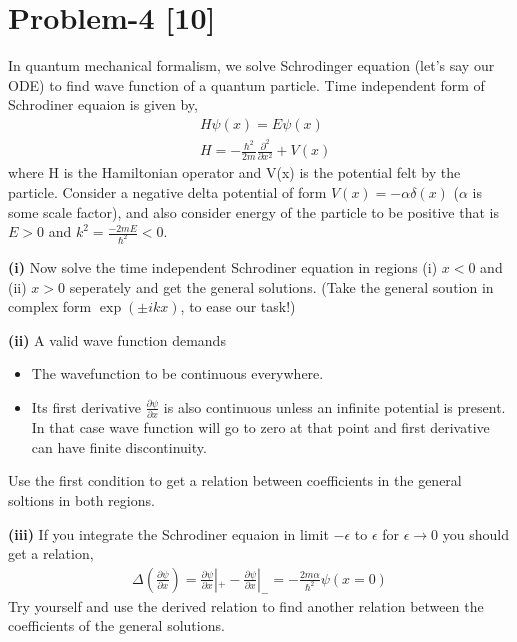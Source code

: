 \documentclass[12pt, a4paper]{article}
\begin{document}
\section*{Problem-4 \hfill \textbf{[10]}}
In quantum mechanical formalism, we solve Schrodinger equation (let's say our ODE) to find wave 
function of a quantum particle. Time independent form of Schrodiner equaion is given by,
\begin{align*}
    &H\psi(x) = E\psi(x)\\
    &H= -\frac{\hbar^2}{2m}\frac{\partial^2}{\partial x^2} + V(x)
\end{align*}
where H is the Hamiltonian operator and V(x) is the potential felt by the particle.
Consider a negative delta potential of form $V(x) = -\alpha\delta(x)$ ($\alpha$ is some scale factor),
and also consider energy of the particle to be positive that is $E>0$ and 
$k^2 = \frac{-2mE}{\hbar^2} <0$. 

\textbf{(i)} Now solve the time independent Schrodiner equation in regions (i) $x<0$ and (ii) $x>0$ 
seperately and get the general solutions. (Take the general soution in complex form $\exp(\pm ikx)$, to ease our task!) 

\textbf{(ii)} A valid wave function demands 
\begin{itemize}
    \item The wavefunction to be continuous everywhere.
    \item Its first derivative $\frac{\partial \psi}{\partial x}$ is also continuous unless an 
    infinite potential is present. In that case wave function will go to zero at that point and first
    derivative can have finite discontinuity.
\end{itemize}
Use the first condition to get a relation between coefficients in the general soltions in both regions.

\textbf{(iii)} If you integrate the Schrodiner equaion in limit $-\epsilon$ to $\epsilon$ for 
$\epsilon \rightarrow 0$ you should get a relation,
\begin{align*}
    \Delta(\frac{\partial \psi}{\partial x}) = \frac{\partial \psi}{\partial x}|_+ - \frac{\partial \psi}{\partial x}|_- 
    = -\frac{2m\alpha}{\hbar^2}\psi(x=0)
\end{align*}
Try yourself and use the derived relation to find another relation between the coefficients of the 
general solutions.
\end{document}
